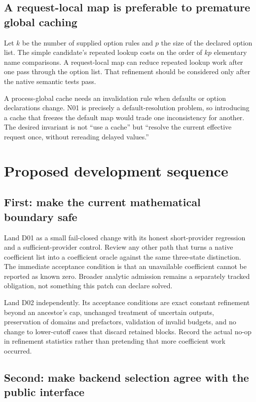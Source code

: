 \documentclass[11pt,letterpaper]{article}
\begin{document}
\subsection{A request-local map is preferable to premature global caching}

Let $k$ be the number of supplied option rules and $p$ the size of the declared option list. The simple candidate's repeated lookup costs on the order of $kp$ elementary name comparisons. A request-local map can reduce repeated lookup work after one pass through the option list. That refinement should be considered only after the native semantic tests pass.

A process-global cache needs an invalidation rule when defaults or option declarations change. N01 is precisely a default-resolution problem, so introducing a cache that freezes the default map would trade one inconsistency for another. The desired invariant is not ``use a cache'' but ``resolve the current effective request once, without rereading delayed values.''

\section{Proposed development sequence}

\subsection{First: make the current mathematical boundary safe}

Land D01 as a small fail-closed change with its honest short-provider regression and a sufficient-provider control. Review any other path that turns a native coefficient list into a coefficient oracle against the same three-state distinction. The immediate acceptance condition is that an unavailable coefficient cannot be reported as known zero. Broader analytic admission remains a separately tracked obligation, not something this patch can declare solved.

Land D02 independently. Its acceptance conditions are exact constant refinement beyond an ancestor's cap, unchanged treatment of uncertain outputs, preservation of domains and prefactors, validation of invalid budgets, and no change to lower-cutoff cases that discard retained blocks. Record the actual no-op in refinement statistics rather than pretending that more coefficient work occurred.

\subsection{Second: make backend selection agree with the public interface}
\end{document}

